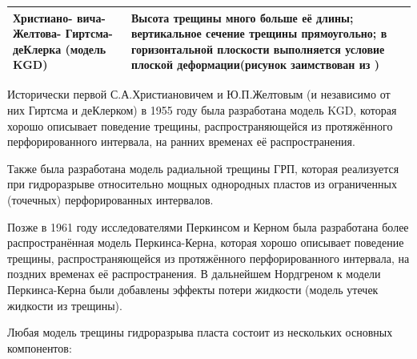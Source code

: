 \begin{longtable}[l]{|L{2.2cm}|m{7.3cm}|L{6.2cm}|}
	Христиано- вича- Желтова- Гиртсма- деКлерка (модель KGD)&Высота трещины много больше её длины; вертикальное сечение трещины прямоугольно; в горизонтальной плоскости выполняется условие плоской деформации\break\hfill\break (рисунок заимствован из \cite{adachi})&\hfill\break{}\hfill\break\\ \hline
	
\end{longtable}
\normalsize%
\endgroup

Исторически первой С.А.Христиановичем и Ю.П.Желтовым (и независимо от них Гиртсма и деКлерком) в 1955 году была разработана модель KGD, которая хорошо описывает поведение трещины, распространяющейся из протяжённого перфорированного интервала, на ранних временах её распространения.

Также была разработана модель радиальной трещины ГРП, которая реализуется при гидроразрыве относительно мощных однородных пластов из ограниченных (точечных) перфорированных интервалов.

Позже в 1961 году исследователями Перкинсом и Керном была разработана более распространённая модель Перкинса-Керна, которая хорошо описывает поведение трещины, распространяющейся из протяжённого перфорированного интервала, на поздних временах её распространения.
В дальнейшем Нордгреном к модели Перкинса-Керна были добавлены эффекты потери жидкости (модель утечек жидкости из трещины).

Любая модель трещины гидроразрыва пласта состоит из нескольких основных компонентов:

